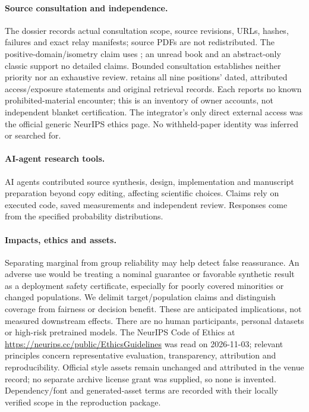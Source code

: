 \paragraph{Source consultation and independence.}
The  dossier records actual consultation scope, source revisions, URLs, hashes, failures and exact relay manifests; source PDFs are not redistributed. The positive-domain/isometry claim uses \citet{egozcue2003ilr}; an unread book and an abstract-only classic support no detailed claims. Bounded consultation establishes neither priority nor an exhaustive review.  retains all nine positions' dated, attributed access/exposure statements and original retrieval records. Each reports no known prohibited-material encounter; this is an inventory of owner accounts, not independent blanket certification. The integrator's only direct external access was the official generic NeurIPS ethics page. No withheld-paper identity was inferred or searched for.

\paragraph{AI-agent research tools.}
AI agents contributed source synthesis, design, implementation and manuscript preparation beyond copy editing, affecting scientific choices. Claims rely on executed code, saved measurements and independent review. Responses come from the specified probability distributions.

\paragraph{Impacts, ethics and assets.}
Separating marginal from group reliability may help detect false reassurance. An adverse use would be treating a nominal guarantee or favorable synthetic result as a deployment safety certificate, especially for poorly covered minorities or changed populations. We delimit target/population claims and distinguish coverage from fairness or decision benefit. These are anticipated implications, not measured downstream effects. There are no human participants, personal datasets or high-risk pretrained models. The NeurIPS Code of Ethics at \url{https://neurips.cc/public/EthicsGuidelines} was read on 2026-11-03; relevant principles concern representative evaluation, transparency, attribution and reproducibility. Official style assets remain unchanged and attributed in the venue record; no separate archive license grant was supplied, so none is invented. Dependency/font and generated-asset terms are recorded with their locally verified scope in the reproduction package.
